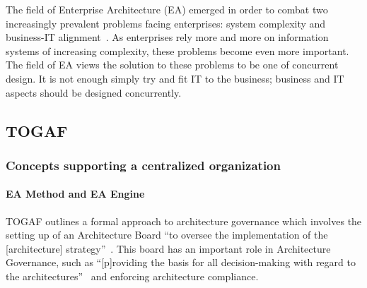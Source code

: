 The field of Enterprise Architecture (EA) emerged in order to combat two increasingly prevalent problems facing enterprises: system complexity and business-IT alignment~\cite{sessions2007}. As enterprises rely more and more on information systems of increasing complexity, these problems become even more important. The field of EA views the solution to these problems to be one of concurrent design. It is not enough simply try and fit IT to the business; business and IT aspects should be designed concurrently.
%
%   
%    

%

\subsection{TOGAF}

\subsubsection{Concepts supporting a centralized organization}

\paragraph*{EA Method and EA Engine}
TOGAF outlines a formal approach to architecture governance which involves the setting up of an Architecture Board ``to oversee the implementation of the [architecture] strategy''~\cite[Ch. 47]{togaf9.1}. This board has an important role in Architecture Governance, such as ``[p]roviding the basis for all decision-making with regard to the architectures''~\cite[Ch. 47]{togaf9.1} and enforcing architecture compliance. 


